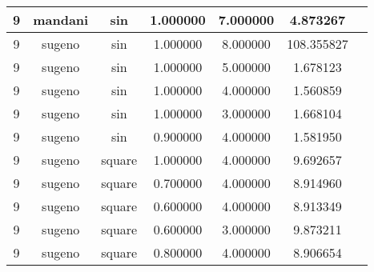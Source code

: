 \begin{tabular}{|c|c|c|c|c|c|c|}
\hline
9 & mandani & sin & 1.000000 & 7.000000 & 4.873267\\
\hline
9 & sugeno & sin & 1.000000 & 8.000000 & 108.355827\\
\hline
9 & sugeno & sin & 1.000000 & 5.000000 & 1.678123\\
\hline
9 & sugeno & sin & 1.000000 & 4.000000 & 1.560859\\
\hline
9 & sugeno & sin & 1.000000 & 3.000000 & 1.668104\\
\hline
9 & sugeno & sin & 0.900000 & 4.000000 & 1.581950\\
\hline
9 & sugeno & square & 1.000000 & 4.000000 & 9.692657\\
\hline
9 & sugeno & square & 0.700000 & 4.000000 & 8.914960\\
\hline
9 & sugeno & square & 0.600000 & 4.000000 & 8.913349\\
\hline
9 & sugeno & square & 0.600000 & 3.000000 & 9.873211\\
\hline
9 & sugeno & square & 0.800000 & 4.000000 & 8.906654\\
\hline
\end{tabular}
